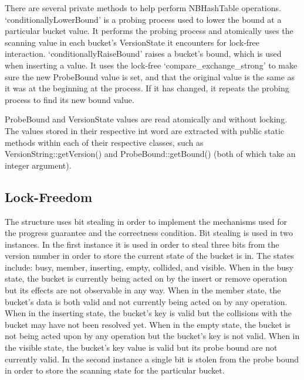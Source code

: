 \documentclass[journal]{IEEEtran}
\begin{document}
There are several private methods to help perform NBHashTable operations. ‘conditionallyLowerBound’ is a probing process used to lower the bound at a particular bucket value. It performs the probing process and atomically uses the scanning value in each bucket’s VersionState it encounters for lock-free interaction. ‘conditionallyRaiseBound’ raises a bucket’s bound, which is used when inserting a value. It uses the lock-free ‘compare\_exchange\_strong’ to make sure the new ProbeBound value is set, and that the original value is the same as it was at the beginning at the process. If it has changed, it repeats the probing process to find its new bound value.

ProbeBound and VersionState values are read atomically and without locking. The values stored in their respective int word are extracted with public static methods within each of their respective classes, such as VersionString::getVersion() and ProbeBound::getBound() (both of which take an integer argument).

\subsection{Lock-Freedom}
The structure uses bit stealing in order to implement the mechanisms used for the progress guarantee and the correctness condition. Bit stealing is used in two instances. In the first instance it is used in order to steal three bits from the version number in order to store the current state of the bucket is in. The states include: busy, member, inserting, empty, collided, and visible. When in the busy state, the bucket is currently being acted on by the insert or remove operation but its effects are not observable in any way. When in the member state, the bucket's data is both valid and not currently being acted on by any operation. When in the inserting state, the bucket's key is valid but the collisions with the bucket may have not been resolved yet. When in the empty state, the bucket is not being acted upon by any operation but the bucket's key is not valid. When in the visible state, the bucket's key value is valid but its probe bound are not currently valid. In the second instance a single bit is stolen from the probe bound in order to store the scanning state for the particular bucket.
\end{document}

